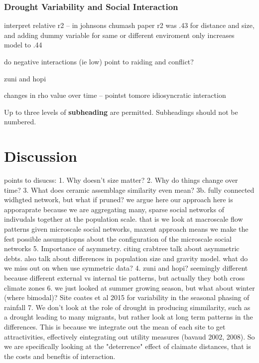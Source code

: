 \documentclass[fleqn,10pt]{wlscirep}
\begin{document}
\subsubsection*{Drought Variability and Social Interaction}

interpret relative r2 -- in johnsons chumash paper r2 was .43 for distance and size, and adding dummy variable for same or different enviroment only increases model to .44

do negative interactions (ie low) point to raiding and conflict?

zuni and hopi

changes in rho value over time -- pointst tomore idiosyncratic interaction

Up to three levels of \textbf{subheading} are permitted. Subheadings should not be numbered.

\section*{Discussion}


points to disucss:
1. Why doesn't size matter?
2. Why do things change over time?
3. What does ceramic assemblage similarity even mean?
3b. fully connected widhgted network, but what if pruned?
  we argue here our approach here is apporaprate because we are aggregating many, sparse social networks of indivudals together at the population scale. that is we look at macroscale flow patterns given microscale social networks, maxent approach means we make the fest possible assumptiopns about the configuration of the microscale social networks
5. Importance of asymmetry. citing crabtree talk about asymmetric debts. also talk about differences in population size and gravity model. what do we miss out on when use symmetric data?
4. zuni and hopi? seemingly different because different external vs internal tie patterns, but actually they both cross climate zones
6. we just looked at summer growing season, but what about winter (where bimodal)? Site coates et al 2015 for variability in the seasonal phasing of rainfall
7. We don't look at the role of drought in producing simmilarity, such as a drought leading to many migrants, but rather look at long term patterns in the differences. This is because we integrate out the mean of each site to get attractivities, effectively eintegrating out utility measures (bavaud 2002, 2008). So we are specifically looking at the "deterrence" effect of claimate distances, that is the costs and beneftis of interaction.
\end{document}
